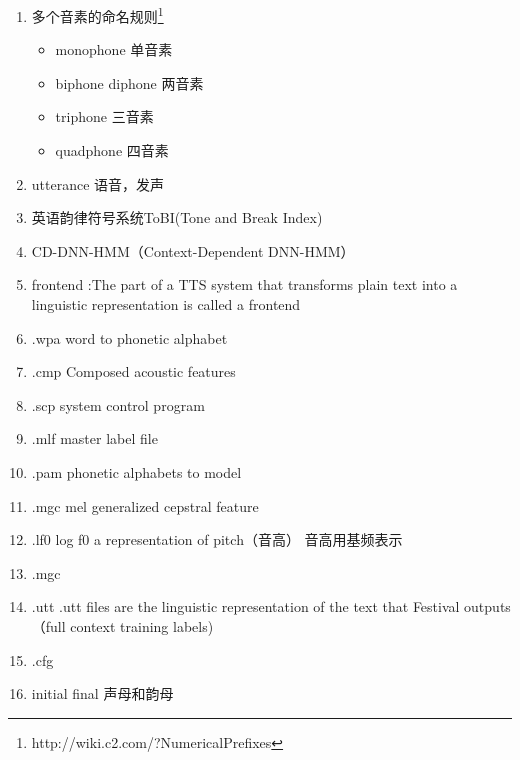 \begin{enumerate}
    \item 多个音素的命名规则\footnote{http://wiki.c2.com/?NumericalPrefixes}
        \begin{itemize}
            \item monophone 单音素
            \item biphone diphone 两音素
            \item triphone 三音素
            \item quadphone 四音素
        \end{itemize}
    \item utterance 语音，发声
    \item 英语韵律符号系统ToBI(Tone and Break Index)
    \item CD-DNN-HMM（Context-Dependent DNN-HMM）
    \item frontend :The part of a TTS system that transforms plain text into a linguistic representation is called a frontend
    \item .wpa  word to phonetic alphabet
    \item .cmp Composed acoustic features 
    \item .scp system control program
    \item .mlf master label file
    \item .pam phonetic alphabets to model
    \item .mgc mel generalized cepstral feature
    \item .lf0 log f0 a representation of pitch（音高） 音高用基频表示
    \item .mgc
    \item .utt .utt files are the linguistic representation of the text that Festival outputs（full context training labels)
    \item .cfg
    \item initial final 声母和韵母
\end{enumerate}

